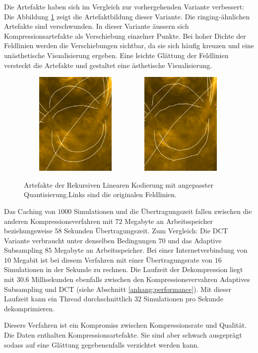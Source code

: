 Die Artefakte haben sich im Vergleich zur vorhergehenden Variante verbessert: Die Abbildung \ref{resultate:loesung2:adaptive:median_extra:artefakte} zeigt die Artefaktbildung dieser Variante. Die ringing-ähnlichen Artefakte sind verschwunden. In dieser Variante äussern sich Kompressionsartefakte als Verschiebung einzelner Punkte. Bei hoher Dichte der Feldlinien werden die Verschiebungen sichtbar, da sie sich häufig kreuzen und eine unästhetische Visualisierung ergeben. Eine leichte Glättung der Feldlinien versteckt die Artefakte und gestaltet eine ästhetische Visualisierung.

\begin{figure}[!htbp]
	\center
		\includegraphics[width=0.49\textwidth,height=5cm,keepaspectratio]{./pictures/resultate/loesung2/variante3/no_artifacts.png}
	\includegraphics[width=0.49\textwidth,height=5cm,keepaspectratio]{./pictures/resultate/loesung2/variante3/artifacts_extra.png}
	\caption{Artefakte der Rekursiven Linearen Kodierung mit angepasster Quantisierung.Links sind die originalen Feldlinien.}
	\label{resultate:loesung2:adaptive:median_extra:artefakte}
\end{figure}

Das Caching von $1000$ Simulationen und die Übertragungszeit fallen zwischen die anderen Kompressionsverfahren mit $72$ Megabyte an Arbeitsspeicher beziehungsweise $58$ Sekunden Übertragungszeit. Zum Vergleich: Die DCT Variante verbraucht unter denselben Bedingungen $70$ und das Adaptive Subsampling $85$ Megabyte an Arbeitsspeicher. Bei einer Internetverbindung von $10$ Megabit ist bei diesem Verfahren mit einer Übertragungsrate von $16$ Simulationen in der Sekunde zu rechnen. Die Laufzeit der Dekompression liegt mit $30.6$ Millisekunden ebenfalls zwischen den Kompressionsvervahren Adaptives Subsampling und DCT (siehe Abschnitt \ref{anhang:performance}). Mit dieser Laufzeit kann ein Thread durchschnittlich $32$ Simulationen pro Sekunde dekomprimieren.

Diesers Verfahren ist ein Kompromiss zwischen Kompressionsrate und Qualität. Die Daten enthalten Kompressionsartefakte. Sie sind aber schwach ausgeprägt sodass auf eine Glättung gegebenenfalls verzichtet werden kann.